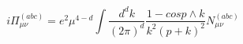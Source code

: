 \begin{equation}
i\Pi_{\mu\nu}^{(abc)}=e^{2}\mu^{4-d}\int
  \frac{d^{d}k}{(2\pi)^{d}}
  \frac{1-cosp\wedge k}{k^{2}(p+k)^{2}}\textit{N}_{\mu\nu}^{(abc)}
  \end{equation}

